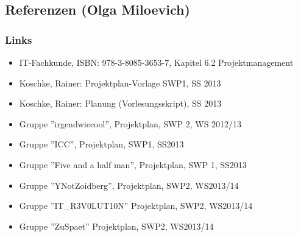 \documentclass[fontsize=12pt,paper=a4,twoside]{scrartcl}
\begin{document}
\subsection{Referenzen (Olga Miloevich)}\label{referenzen}

\subsubsection{Links}
\begin{itemize}

  \item IT-Fachkunde, ISBN: 978-3-8085-3653-7, Kapitel 6.2 Projektmanagement
  \item Koschke, Rainer: Projektplan-Vorlage SWP1, SS 2013
  \item Koschke, Rainer: Planung (Vorlesungsskript), SS 2013
  \item Gruppe ''irgendwiecool'', Projektplan, SWP 2, WS 2012/13
  \item Gruppe ''ICC'', Projektplan, SWP1, SS2013
  \item Gruppe ''Five and a half man'', Projektplan, SWP 1, SS2013
  \item Gruppe ''YNotZoidberg'', Projektplan, SWP2, WS2013/14
  \item Gruppe ''IT\_R3V0LUT10N'' Projektplan, SWP2, WS2013/14
  \item Gruppe ''ZuSpaet'' Projektplan, SWP2, WS2013/14


\end{itemize}
\end{document}
